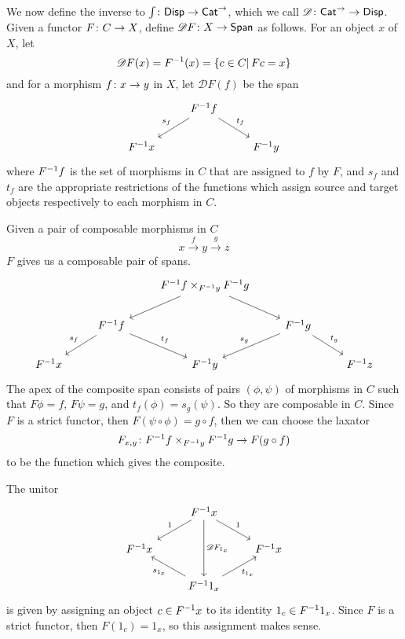 We now define the inverse to $\textstyle{\int} \colon \mathsf{Disp} \to \mathsf{Cat}^\to$, which we call  $\mathscr D \colon \mathsf{Cat}^\to \to \mathsf{Disp}$. Given a functor $F \colon C \to X$, define $\mathscr DF \colon X \to \mathsf{Span}$ as follows. For an object $x$ of $X$, let
\[
    \mathscr DF(x) = F^{-1} (x) = \{c \in C |\, Fc=x\}
\]
and for a morphism $f \colon x \to y$ in $X$, let $\mathscr DF(f)$ be the span
\[
\begin{tikzcd}
    &
    F\inv f
    \arrow[dl, "s_f", swap]
    \arrow[dr, "t_f"]
    \\
    F\inv x
    &&
    F\inv y
\end{tikzcd}\]
where $F^{-1} f$ is the set of morphisms in $C$ that are assigned to $f$ by $F$, and $s_f$ and $t_f$ are the appropriate restrictions of the functions which assign source and target objects respectively to each morphism in $C$.

Given a pair of composable morphisms in $C$
\[
    x \xrightarrow f y \xrightarrow g z
\]
$F$ gives us a composable pair of spans.
\[
\begin{tikzcd}
    &&
    F\inv f \times_{F\inv y} F\inv g
    \arrow[dl]
    \arrow[dr]
    \\&
    F\inv f
    \arrow[dl, "s_f", swap]
    \arrow[dr, "t_f"]
    &&
    F\inv g
    \arrow[dl, "s_g", swap]
    \arrow[dr, "t_g"]
    \\
    F\inv x
    &&
    F\inv y
    &&
    F\inv z
\end{tikzcd}\]
The apex of the composite span consists of pairs $(\phi,\psi)$ of morphisms in $C$ such that $F\phi = f$, $F\psi = g$, and $t_f(\phi) = s_g(\psi)$. So they are composable in $C$. Since $F$ is a strict functor, then $F(\psi \circ \phi) = g \circ f$, then we can choose the laxator
\[
    F_{x,y} \colon F^{-1} f \times_{F^{-1} y} F^{-1} g \to F(g \circ f)
\]
to be the function which gives the composite.

The unitor 
\[
\begin{tikzcd}
    &
    F\inv x
    \arrow[dl, "1", swap]
    \arrow[dd, "\mathscr DF_{1_x}"]
    \arrow[dr, "1"]
    \\
    F\inv x 
    && 
    F\inv x 
    \\&
    F\inv 1_x
    \arrow[ul, "s_{1_x}"]
    \arrow[ur, swap, "t_{1_x}"]
\end{tikzcd}
\]
is given by assigning an object $c \in F^{-1} x$ to its identity $1_c \in F^{-1} 1_x$. Since $F$ is a strict functor, then $F(1_c) = 1_x$, so this assignment makes sense.

